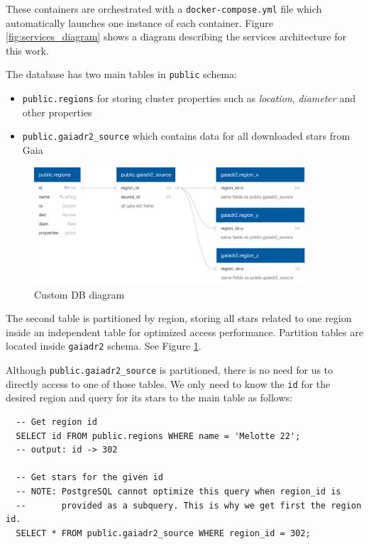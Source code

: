 \documentclass[11pt, a4paper, english]{book}
\begin{document}
These containers are orchestrated with a \verb|docker-compose.yml| file which automatically launches one instance of each container.
Figure \ref{fig:services_diagram} shows a diagram describing the services architecture for this work.

The database has two main tables in \verb|public| schema:

\begin{itemize}
  \item \verb|public.regions| for storing cluster properties such as \emph{location}, \emph{diameter} and other properties
  \item \verb|public.gaiadr2_source| which contains data for all downloaded stars from Gaia
\end{itemize}

\begin{figure}[htbp]
  \centering
  \includegraphics[width=0.9\textwidth]{../figures/customdb_diagram.pdf}
  \caption{Custom DB diagram}
  \label{fig:customdb_diagram}
\end{figure}

The second table is partitioned by region,
storing all stars related to one region inside an independent table for optimized access performance.
Partition tables are located inside \verb|gaiadr2| schema. See Figure \ref{fig:customdb_diagram}.

Although \verb|public.gaiadr2_source| is partitioned, there is no need for us to directly access to one of those tables.
We only need to know the \verb|id| for the desired region and query for its stars to the main table as follows:

\begin{verbatim}
  -- Get region id
  SELECT id FROM public.regions WHERE name = 'Melotte 22';
  -- output: id -> 302

  -- Get stars for the given id
  -- NOTE: PostgreSQL cannot optimize this query when region_id is
  --       provided as a subquery. This is why we get first the region id.
  SELECT * FROM public.gaiadr2_source WHERE region_id = 302;
\end{verbatim}
\end{document}
